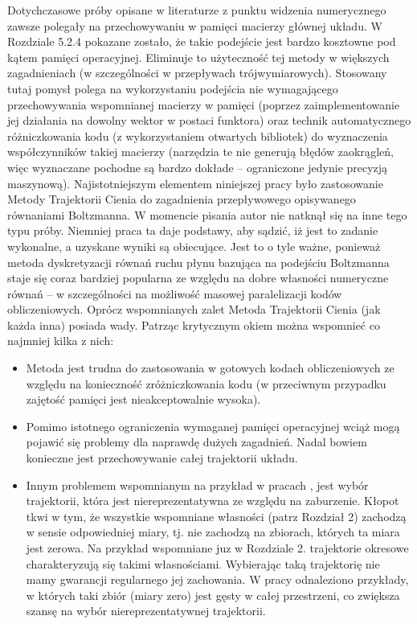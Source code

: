 \documentclass[12pt]{article}
\begin{document}
Dotychczasowe próby opisane w literaturze z punktu widzenia numerycznego zawsze polegały na przechowywaniu w pamięci macierzy głównej układu. W Rozdziale 5.2.4 pokazane zostało, że takie podejście jest bardzo kosztowne pod kątem pamięci operacyjnej. Eliminuje to użyteczność tej metody w większych zagadnieniach (w szczególności w przepływach trójwymiarowych). Stosowany tutaj pomysł polega na wykorzystaniu podejścia nie wymagającego przechowywania wspomnianej macierzy w pamięci (poprzez zaimplementowanie jej działania na dowolny wektor w postaci funktora) oraz technik automatycznego różniczkowania kodu (z wykorzystaniem otwartych bibliotek) do wyznaczenia współczynników takiej macierzy (narzędzia te nie generują błędów zaokrągleń, więc wyznaczane pochodne są bardzo dokłade – ograniczone jedynie precyzją maszynową). \newline
Najistotniejszym elementem niniejszej pracy było zastosowanie Metody Trajektorii Cienia do zagadnienia przepływowego opisywanego równaniami Boltzmanna. W momencie pisania autor nie natknął się na inne tego typu próby. Niemniej praca ta daje podstawy, aby sądzić, iż jest to zadanie wykonalne, a uzyskane wyniki są obiecujące. Jest to o tyle ważne, ponieważ metoda dyskretyzacji równań ruchu płynu bazująca na podejściu Boltzmanna staje się coraz bardziej popularna ze względu na dobre własności numeryczne równań – w szczególności na możliwość masowej paralelizacji kodów obliczeniowych. 
Oprócz wspomnianych zalet Metoda Trajektorii Cienia (jak każda inna) posiada wady. Patrząc krytycznym okiem można wspomnieć co najmniej kilka z nich:
\begin{itemize}
	\item Metoda jest trudna do zastosowania w gotowych kodach obliczeniowych ze względu na konieczność zróżniczkowania kodu (w przeciwnym przypadku zajętość pamięci jest nieakceptowalnie wysoka).
	\item Pomimo istotnego ograniczenia wymaganej pamięci operacyjnej wciąż mogą pojawić się problemy dla naprawdę dużych zagadnień. Nadal bowiem konieczne jest przechowywanie całej trajektorii układu.
	\item Innym problemem wspomnianym na przykład w pracach \cite{Chandramoorthy2}, \cite{Chandramoorthy3} jest wybór trajektorii, która jest niereprezentatywna ze względu na zaburzenie. Kłopot tkwi w tym, że wszystkie wspomniane własności (patrz Rozdział 2) zachodzą w sensie odpowiedniej miary, tj. nie zachodzą na zbiorach, których ta miara jest zerowa. Na przykład wspomniane juz w Rozdziale 2. trajektorie okresowe charakteryzują się takimi własnościami. Wybierając taką trajektorię nie mamy gwarancji regularnego jej zachowania. W pracy \cite{Grebogi} odnaleziono przykłady, w których taki zbiór (miary zero) jest gęsty w całej przestrzeni, co zwiększa szansę na wybór niereprezentatywnej trajektorii.
\end{itemize}
\end{document}
